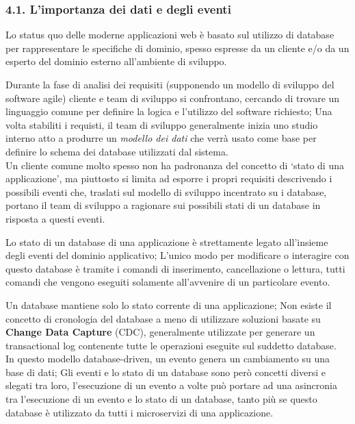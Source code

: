 \documentclass[]{article}
\begin{document}
\subsubsection{4.1. L'importanza dei dati e degli
eventi}\label{limportanza-dei-dati-e-degli-eventi}

Lo status quo delle moderne applicazioni web è basato sul utilizzo di
database per rappresentare le specifiche di dominio, spesso espresse da
un cliente e/o da un esperto del dominio esterno all'ambiente di
sviluppo.

Durante la fase di analisi dei requisiti (supponendo un modello di
sviluppo del software agile) cliente e team di sviluppo si confrontano,
cercando di trovare un linguaggio comune per definire la logica e
l'utilizzo del software richiesto; Una volta stabiliti i requisti, il
team di sviluppo generalmente inizia uno studio interno atto a produrre
un \emph{modello dei dati} che verrà usato come base per definire lo
schema dei database utilizzati dal sistema.\\
Un cliente comune molto spesso non ha padronanza del concetto di `stato
di una applicazione', ma piuttosto si limita ad esporre i propri
requisiti descrivendo i possibili eventi che, traslati sul modello di
sviluppo incentrato su i database, portano il team di sviluppo a
ragionare sui possibili stati di un database in risposta a questi
eventi.

Lo stato di un database di una applicazione è strettamente legato
all'insieme degli eventi del dominio applicativo; L'unico modo per
modificare o interagire con questo database è tramite i comandi di
inserimento, cancellazione o lettura, tutti comandi che vengono eseguiti
solamente all'avvenire di un particolare evento.

Un database mantiene solo lo stato corrente di una applicazione; Non
esiste il concetto di cronologia del database a meno di utilizzare
soluzioni basate su \textbf{Change Data Capture} (CDC), generalmente
utilizzate per generare un transactional log contenente tutte le
operazioni eseguite sul suddetto database.\\
In questo modello database-driven, un evento genera un cambiamento su
una base di dati; Gli eventi e lo stato di un database sono però
concetti diversi e slegati tra loro, l'esecuzione di un evento a volte
può portare ad una asincronia tra l'esecuzione di un evento e lo stato
di un database, tanto più se questo database è utilizzato da tutti i
microservizi di una applicazione.
\end{document}
